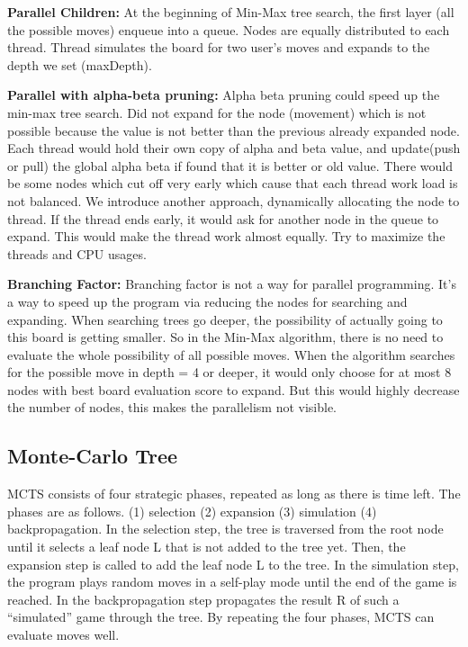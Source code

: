 \documentclass[sigconf]{acmart}
\begin{document}
{\bfseries Parallel Children:}
At the beginning of Min-Max tree search, the first layer (all the possible moves) enqueue into a queue. Nodes are equally distributed to each thread. Thread simulates the board for two user’s moves and expands to the depth we set (maxDepth).  

{\bfseries Parallel with alpha-beta pruning:}
Alpha beta pruning could speed up the min-max tree search. Did not expand for the node (movement) which is not possible because the value is not better than the previous already expanded node. Each thread would hold their own copy of alpha and beta value, and update(push or pull) the global alpha beta if found that it is better or old value. There would be some nodes which cut off very early which cause that each thread work load is not balanced. We introduce another approach, dynamically allocating the node to thread. If the thread ends early, it would ask for another node in the queue to expand. This would make the thread work almost equally. Try to maximize the threads and CPU usages.

{\bfseries Branching Factor:}
Branching factor is not a way for parallel programming. It’s a way to speed up the program via reducing the nodes for searching and expanding. When searching trees go deeper, the possibility of actually going to this board is getting smaller. So in the Min-Max algorithm, there is no need to evaluate the whole possibility of all possible moves. When the algorithm searches for the possible move in depth = 4 or deeper, it would only choose for at most 8 nodes with best board evaluation score to expand. But this would highly decrease the number of nodes, this makes the parallelism not visible. 


\subsection{Monte-Carlo Tree}

MCTS consists of four strategic phases, repeated as long as there is time left. The phases are as follows. (1) selection (2) expansion (3) simulation (4) backpropagation. In the selection step, the tree is traversed from the root node until it selects a leaf node L that is not added to the tree yet. Then, the expansion step is called to add the leaf node L to the tree. In the simulation step, the program plays random moves in a self-play mode until the end of the game is reached. In the backpropagation step propagates the result R of such a “simulated” game through the tree. By repeating the four phases, MCTS can evaluate moves well.
\end{document}
